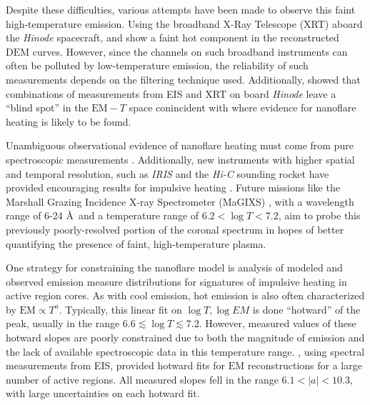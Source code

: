\documentclass[tighten,apj]{emulateapj}
\newcommand{\ang}{\AA~}
\begin{document}
	\par Despite these difficulties, various attempts have been made to observe this faint high-temperature emission. Using the broadband X-Ray Telescope (XRT) aboard the \textit{Hinode} spacecraft, \citet{schmelz_hinode_2009} and \citet{reale_evidence_2009} show a faint hot component in the reconstructed $\mathrm{DEM}$ curves. However, since the channels on such broadband instruments can often be polluted by low-temperature emission, the reliability of such measurements depends on the filtering technique used. Additionally, \citet{winebarger_defining_2012} showed that combinations of measurements from EIS \citep{culhane_euv_2007} and XRT \citep{golub_x-ray_2007} on board \textit{Hinode} \citep{kosugi_hinode_2007} leave a ``blind spot'' in the $\mathrm{EM}-T$ space conincident with where evidence for nanoflare heating is likely to be found. 
	\par Unambiguous observational evidence of nanoflare heating must come from pure spectroscopic measurements \citep[see][]{brosius_pervasive_2014}. Additionally, new instruments with higher spatial and temporal resolution, such as \textit{IRIS} \citep{de_pontieu_interface_2014} and the \textit{Hi-C} sounding rocket \citep{cirtain_energy_2013} have provided encouraging results for impulsive heating \citep{testa_observing_2013,testa_evidence_2014}. Future missions like the Marshall Grazing Incidence X-ray Spectrometer (MaGIXS) \citep{kobayashi_marshall_2011,winebarger_new_2014}, with a wavelength range of 6-24 \ang and a temperature range of $6.2<\log{T}<7.2$, aim to probe this previously poorly-resolved portion of the coronal spectrum in hopes of better quantifying the presence of faint, high-temperature plasma.
	\par One strategy for constraining the nanoflare model is analysis of modeled and observed emission measure distributions for signatures of impulsive heating in active region cores. As with cool emission, hot emission is also often characterized by $\mathrm{EM}\propto T^a$. Typically, this linear fit on $\log{T},\log{EM}$ is done ``hotward'' of the peak, usually in the range $6.6\lesssim\log{T}\lesssim7.2$. However, measured values of these hotward slopes are poorly constrained due to both the magnitude of emission and the lack of available spectroscopic data in this temperature range. \citet{warren_systematic_2012}, using spectral measurements from EIS, provided hotward fits for $\mathrm{EM}$ reconstructions for a large number of active regions. All measured slopes fell in the range $6.1<|a|<10.3$, with large uncertainties on each hotward fit.
\end{document}
